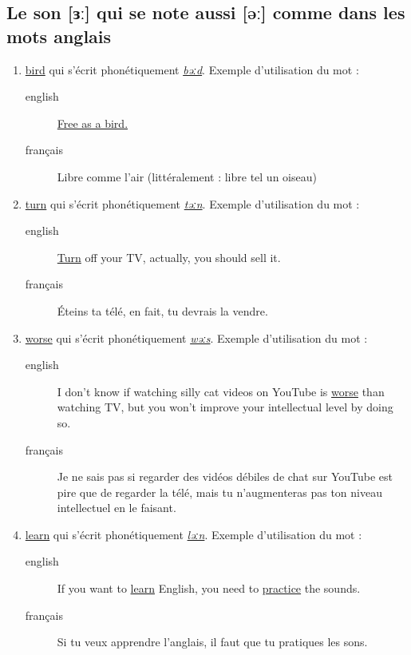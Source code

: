 \documentclass[12pt,a4paper]{book}
\begin{document}
\subsection{Le son [ɜː] qui se note aussi [əː] comme dans les mots anglais}
\label{sec:org53c6f2e}
\begin{enumerate}
\item \href{http://www.wordreference.com/enfr/bird}{bird} qui s'écrit phonétiquement \href{https://en.oxforddictionaries.com/definition/bird}{\emph{bəːd}}. Exemple d'utilisation du mot :
\begin{description}
\item[{english}] \textenglish{\href{https://genius.com/The-beatles-free-as-a-bird-lyrics}{Free as a bird.}}
\item[{français}] Libre comme l'air (littéralement : libre tel un
oiseau)
\end{description}
\item \href{http://www.wordreference.com/enfr/turn}{turn} qui s'écrit phonétiquement \href{https://en.oxforddictionaries.com/definition/turn}{\emph{təːn}}. Exemple d'utilisation du mot : 
\begin{description}
\item[{english}] \textenglish{\href{https://youtu.be/WLTI2rWAlV4}{Turn} off your TV, actually, you should sell it.}
\item[{français}] Éteins ta télé, en fait, tu devrais la vendre.
\end{description}
\item \href{http://www.wordreference.com/enfr/worse}{worse} qui s'écrit phonétiquement \href{https://en.oxforddictionaries.com/definition/worse}{\emph{wəːs}}. Exemple d'utilisation du mot : 
\begin{description}
\item[{english}] \textenglish{I don't know if watching silly cat videos on YouTube
is \href{https://youtu.be/JHWhzS0zdOc}{worse} than watching TV, but you won't improve your
intellectual level by doing so.}
\item[{français}] Je ne sais pas si regarder des vidéos débiles de chat
sur YouTube est pire que de regarder la télé, mais tu
n'augmenteras pas ton niveau intellectuel en le faisant.
\end{description}
\item \href{http://www.wordreference.com/enfr/learn}{learn} qui s'écrit phonétiquement \href{https://en.oxforddictionaries.com/definition/learn}{\emph{ləːn}}. Exemple d'utilisation du mot :
\begin{description}
\item[{english}] \textenglish{If you want to \href{https://youtu.be/1xXs7MAsB0w}{learn} English, you need to \href{https://youtu.be/wmCAKUFKZ7Y}{practice}
the sounds.}
\item[{français}] Si tu veux apprendre l'anglais, il faut que tu
pratiques les sons.
\end{description}
\end{enumerate}
\end{document}
